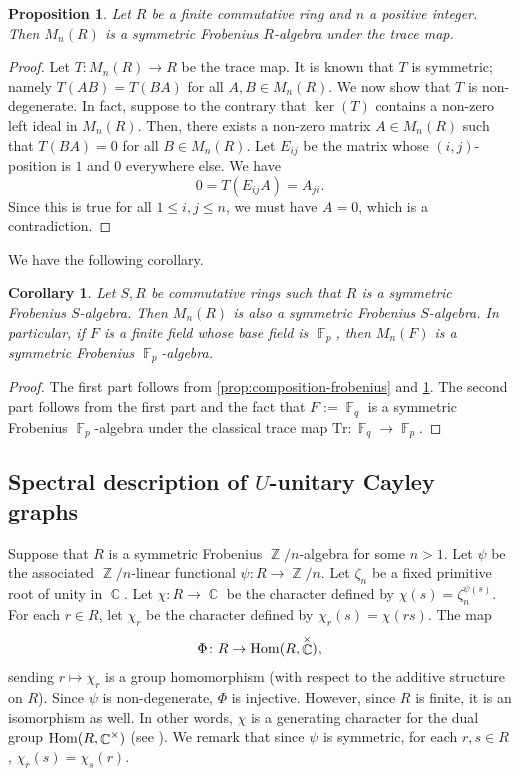 \documentclass[12pt, a4paper]{amsart}
\newtheorem{prop}[thm]{Proposition}
\newtheorem{cor}[thm]{Corollary}
\theoremstyle{definition}
\DeclareMathOperator{\C}{\mathbb{C}}
\DeclareMathOperator{\Z}{\mathbb{Z}}
\DeclareMathOperator{\F}{\mathbb{F}}
\DeclareMathOperator{\Hom}{{\rm Hom}}
\numberwithin{equation}{section}
\begin{document}
\begin{prop} \label{prop:matrix-frobenius}
    Let $R$ be a finite commutative ring and $n$ a positive integer. Then $M_n(R)$ is a symmetric Frobenius $R$-algebra under the trace map.  
\end{prop}
\begin{proof}
    Let $T\colon M_n(R) \to R$ be the trace map. It is known that $T$ is symmetric; namely $T(AB)=T(BA)$ for all $A,B \in M_n(R).$ We now show that $T$ is non-degenerate. In fact, suppose to the contrary that $\ker(T)$ contains a non-zero left ideal in $M_n(R).$ Then, there exists a non-zero matrix $A \in M_n(R)$ such that $T(BA)=0$ for all $B \in M_n(R).$ Let $E_{ij}$ be the matrix whose $(i,j)$-position is $1$ and $0$ everywhere else. We have 
    \[ 0= T(E_{ij}A)=A_{ji}.\]
    Since this is true for all $1 \leq i,j \leq n$, we must have $A=0$, which is a contradiction. 
\end{proof}
We have the following corollary. 
\begin{cor} \label{cor:matrix-symmetric}
    Let $S, R$ be commutative rings such that $R$ is a symmetric  Frobenius $S$-algebra. Then $M_n(R)$ is also a symmetric  Frobenius $S$-algebra. In particular, if $F$ is a finite field whose base field is $\F_p$, then $M_n(F)$ is a symmetric Frobenius $\F_p$-algebra. 
\end{cor}

\begin{proof}
    The first part follows from  \cref{prop:composition-frobenius} and \cref{prop:matrix-frobenius}. The second part follows from the first part and the fact that $F:=\F_q$ is a symmetric Frobenius $\F_p$-algebra under the classical trace map $\text{Tr}\colon \F_q \to \F_p.$
\end{proof}

\subsection{Spectral description of $U$-unitary Cayley graphs}
Suppose that $R$ is a symmetric Frobenius $\Z/n$-algebra for some $n >1.$ Let $\psi$ be the associated $\Z/n$-linear functional $\psi\colon R \to \Z/n$.  Let $\zeta_n$ be a fixed primitive root of unity in $\C$. Let $\chi\colon R \to \C$ be the character defined by $\chi(s)=\zeta_n^{\psi(s)}.$ For each $r \in R$, let $\chi_r$ be the character defined by $\chi_r(s)=\chi(rs).$ The map 
\[ \Phi\colon R \to \Hom(R, \C^{\times}), \] 
sending $r \mapsto \chi_r$ is a group homomorphism (with respect to the additive structure on $R$). Since $\psi$ is non-degenerate, $\Phi$ is injective. However, since $R$ is finite, it is an isomorphism as well. In other words, $\chi$ is a generating character for the dual group $\Hom(R, \C^{\times})$ (see \cite{honold2001characterization}). We remark that since $\psi$ is symmetric, for each $r,s \in R$, $\chi_{r}(s)=\chi_{s}(r).$
\end{document}
